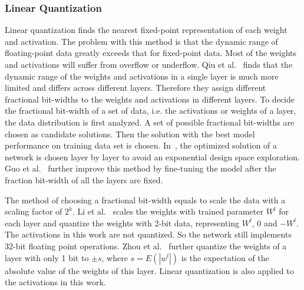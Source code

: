 \subsubsection{Linear Quantization}
Linear quantization finds the nearest fixed-point representation of each weight and activation. The problem with this method is that the dynamic range of floating-point data greatly exceeds that for fixed-point data. Most of the weights and activations will suffer from overflow or underflow. Qiu et al.~\cite{qiu2016going} finds that the dynamic range of the weights and activations in a single layer is much more limited and differs across different layers. Therefore they assign different fractional bit-widths to the weights and activations in different layers. To decide the fractional bit-width of a set of data, i.e. the activations or weights of a layer, the data distribution is first analyzed. A set of possible fractional bit-widths are chosen as candidate solutions. Then the solution with the best model performance on training data set is chosen. In~\cite{qiu2016going}, the optimized solution of a network is chosen layer by layer to avoid an exponential design space exploration. Guo et al.~\cite{guo2017angel} further improve this method by fine-tuning the model after the fraction bit-width of all the layers are fixed.

The method of choosing a fractional bit-width equals to scale the data with a scaling factor of $2^k$. Li et al.~\cite{li2016ternary} scales the weights with trained parameter $W^l$ for each layer and quantize the weights with 2-bit data, representing $W^l$, 0 and $-W^l$. The activations in this work are not quantized. So the network still implements 32-bit floating point operations. Zhou et al.~\cite{zhou2016dorefa} further quantize the weights of a layer with only 1 bit to $\pm s$, where $s=E(|w^l|)$ is the expectation of the absolute value of the weights of this layer. Linear quantization is also applied to the activations in this work.

